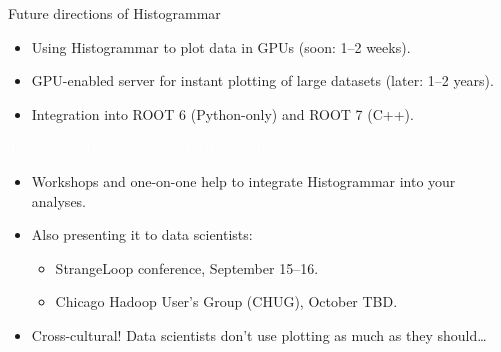\documentclass{beamer}
\begin{document}
\begin{frame}{Future directions of Histogrammar}
\vspace{0.5 cm}
\begin{itemize}\setlength{\itemsep}{0.2 cm}
\item Using Histogrammar to plot data in GPUs (soon: 1--2 weeks).
\item GPU-enabled server for instant plotting of large datasets (later: 1--2 years).
\item Integration into ROOT 6 (Python-only) and ROOT 7 (C++).
\end{itemize}

\vspace{1 cm}

\vspace{-0.35 cm}
\hspace{-0.83 cm} \textcolor{white}{\Large Targeting both physicists and data scientists}

\vspace{0.35 cm}
\begin{itemize}\setlength{\itemsep}{0.2 cm}
\item Workshops and one-on-one help to integrate Histogrammar into your analyses.
\item Also presenting it to data scientists:
\begin{itemize}
\item StrangeLoop conference, September 15--16.
\item Chicago Hadoop User's Group (CHUG), October TBD.
\end{itemize}
\item Cross-cultural! Data scientists don't use plotting as much as they should\ldots
\end{itemize}
\end{frame}
\end{document}
